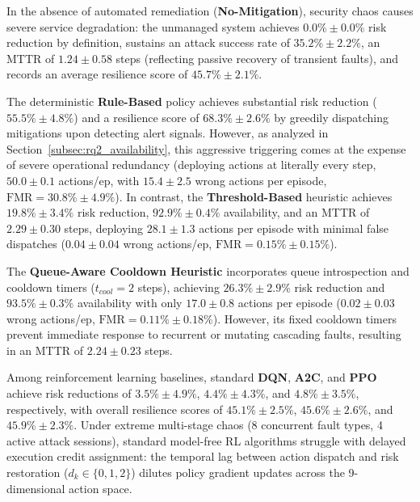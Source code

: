 \documentclass[ASNA,twocolumn]{USG}
\begin{document}
In the absence of automated remediation (\textbf{No-Mitigation}), security chaos causes severe service degradation: the unmanaged system achieves $0.0\% \pm 0.0\%$ risk reduction by definition, sustains an attack success rate of $35.2\% \pm 2.2\%$, an MTTR of $1.24 \pm 0.58$ steps (reflecting passive recovery of transient faults), and records an average resilience score of $45.7\% \pm 2.1\%$.

The deterministic \textbf{Rule-Based} policy achieves substantial risk reduction ($55.5\% \pm 4.8\%$) and a resilience score of $68.3\% \pm 2.6\%$ by greedily dispatching mitigations upon detecting alert signals. However, as analyzed in Section~\ref{subsec:rq2_availability}, this aggressive triggering comes at the expense of severe operational redundancy (deploying actions at literally every step, $50.0 \pm 0.1$ actions/ep, with $15.4 \pm 2.5$ wrong actions per episode, $\text{FMR} = 30.8\% \pm 4.9\%$). In contrast, the \textbf{Threshold-Based} heuristic achieves $19.8\% \pm 3.4\%$ risk reduction, $92.9\% \pm 0.4\%$ availability, and an MTTR of $2.29 \pm 0.30$ steps, deploying $28.1 \pm 1.3$ actions per episode with minimal false dispatches ($0.04 \pm 0.04$ wrong actions/ep, $\text{FMR} = 0.15\% \pm 0.15\%$).

The \textbf{Queue-Aware Cooldown Heuristic} incorporates queue introspection and cooldown timers ($t_{cool}=2$ steps), achieving $26.3\% \pm 2.9\%$ risk reduction and $93.5\% \pm 0.3\%$ availability with only $17.0 \pm 0.8$ actions per episode ($0.02 \pm 0.03$ wrong actions/ep, $\text{FMR} = 0.11\% \pm 0.18\%$). However, its fixed cooldown timers prevent immediate response to recurrent or mutating cascading faults, resulting in an MTTR of $2.24 \pm 0.23$ steps.

Among reinforcement learning baselines, standard \textbf{DQN}, \textbf{A2C}, and \textbf{PPO} achieve risk reductions of $3.5\% \pm 4.9\%$, $4.4\% \pm 4.3\%$, and $4.8\% \pm 3.5\%$, respectively, with overall resilience scores of $45.1\% \pm 2.5\%$, $45.6\% \pm 2.6\%$, and $45.9\% \pm 2.3\%$. Under extreme multi-stage chaos (8 concurrent fault types, 4 active attack sessions), standard model-free RL algorithms struggle with delayed execution credit assignment: the temporal lag between action dispatch and risk restoration ($d_k \in \{0, 1, 2\}$) dilutes policy gradient updates across the 9-dimensional action space.
\end{document}
